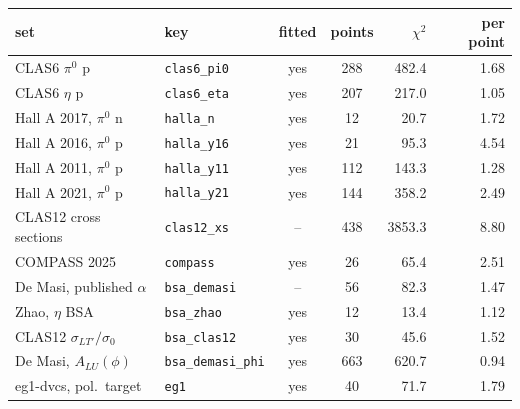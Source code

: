 \begin{tabular}{llccrr}
\toprule
set & key & fitted & points & $\chi^2$ & per point \\
\midrule
CLAS6 $\pi^0$ p & \texttt{clas6\_pi0} & yes & 288 & 482.4 & 1.68 \\
CLAS6 $\eta$ p & \texttt{clas6\_eta} & yes & 207 & 217.0 & 1.05 \\
Hall A 2017, $\pi^0$ n & \texttt{halla\_n} & yes & 12 & 20.7 & 1.72 \\
Hall A 2016, $\pi^0$ p & \texttt{halla\_y16} & yes & 21 & 95.3 & 4.54 \\
Hall A 2011, $\pi^0$ p & \texttt{halla\_y11} & yes & 112 & 143.3 & 1.28 \\
Hall A 2021, $\pi^0$ p & \texttt{halla\_y21} & yes & 144 & 358.2 & 2.49 \\
CLAS12 cross sections & \texttt{clas12\_xs} & -- & 438 & 3853.3 & 8.80 \\
COMPASS 2025 & \texttt{compass} & yes & 26 & 65.4 & 2.51 \\
De Masi, published $\alpha$ & \texttt{bsa\_demasi} & -- & 56 & 82.3 & 1.47 \\
Zhao, $\eta$ BSA & \texttt{bsa\_zhao} & yes & 12 & 13.4 & 1.12 \\
CLAS12 $\sigma_{LT'}/\sigma_0$ & \texttt{bsa\_clas12} & yes & 30 & 45.6 & 1.52 \\
De Masi, $A_{LU}(\phi)$ & \texttt{bsa\_demasi\_phi} & yes & 663 & 620.7 & 0.94 \\
eg1-dvcs, pol.\ target & \texttt{eg1} & yes & 40 & 71.7 & 1.79 \\
\bottomrule
\end{tabular}

